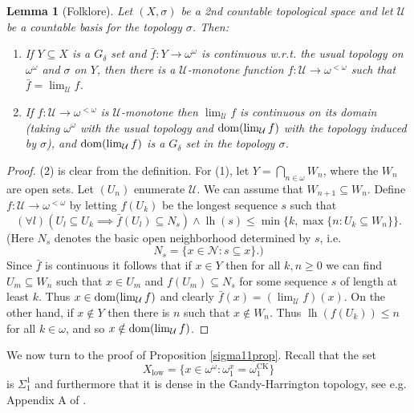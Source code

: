 \documentclass[11pt, english]{article}
\DeclareMathOperator{\lh}{lh} \DeclareMathOperator{\inn}{Inn}
\DeclareMathOperator{\low}{low}
\DeclareMathOperator{\ck}{CK}
\newcommand{\baire}{\mathscr N}
\begin{document}
\newtheorem{lemma}{Lemma}
\begin{lemma}[Folklore]
Let $(X,\sigma)$ be a 2nd countable topological space and let
$\mathcal U$ be a countable basis for the topology $\sigma$. Then:

\begin{enumerate}[\rm (1)]

\item If $Y\subseteq X$ is a $G_\delta$ set and $\bar
f:Y\to\omega^\omega$ is continuous w.r.t. the usual topology on
$\omega^\omega$ and $\sigma$ on $Y$, then there is a $\mathcal
U$-monotone function $f:\mathcal U\to\omega^{<\omega}$ such that
$\bar f=\lim_{\mathcal U} f$.

\item If $f:\mathcal U\to\omega^{<\omega}$ is $\mathcal
U$-monotone then $\lim_{\mathcal U} f$ is continuous on its domain
(taking $\omega^\omega$ with the usual topology and
$\operatorname{dom}(\lim_{\mathcal U} f)$ with the topology induced by
$\sigma$), and $\operatorname{dom}(\lim_{\mathcal U} f)$ is a $G_\delta$ set in
the topology $\sigma$.

\end{enumerate}
\label{folklorelemma}
\end{lemma}

\begin{proof}
(2) is clear from the definition. For (1), let
$Y=\bigcap_{n\in\omega} W_n$, where the $W_n$ are open sets. Let
$(U_n)$ enumerate $\mathcal U$. We can assume that
$W_{n+1}\subseteq W_n$. Define $f:\mathcal U\to\omega^{<\omega}$
by letting $f(U_k)$ be the longest sequence $s$ such that
$$
(\forall l)(U_l\subseteq U_k\implies \bar f(U_l)\subseteq
N_s)\wedge \lh(s)\leq\min\{k,\max\{n:U_k\subseteq W_n\}\}.
$$
(Here $N_s$ denotes the basic open neighborhood determined by $s$,
i.e.
$$
N_s=\{x\in\baire: s\subseteq x\}.)
$$
Since $\bar f$ is continuous it follows that if $x\in Y$ then for
all $k,n\geq 0$ we can find $U_m\subseteq W_n$ such that $x\in
U_m$ and $f(U_m)\subseteq N_s$ for some sequence $s$ of length at
least $k$. Thus $x\in\operatorname{dom}(\lim_{\mathcal U}f)$ and clearly $\bar
f(x)=(\lim_{\mathcal U} f)(x)$. On the other hand, if $x\notin Y$
then there is $n$ such that $x\notin W_n$. Thus $\lh(f(U_k))\leq
n$ for all $k\in\omega$, and so $x\notin\operatorname{dom}(\lim_{\mathcal U}
f)$.
\end{proof}

We now turn to the proof of Proposition \ref{sigma11prop}. Recall that the set
$$
X_{\low}=\{x\in\omega^\omega: \omega_1^{x}=\omega_1^{\ck}\}
$$
is $\Sigma^1_1$ and furthermore that it is dense in the
Gandy-Harrington topology, see e.g. Appendix A of \cite{gao09}.
\end{document}
